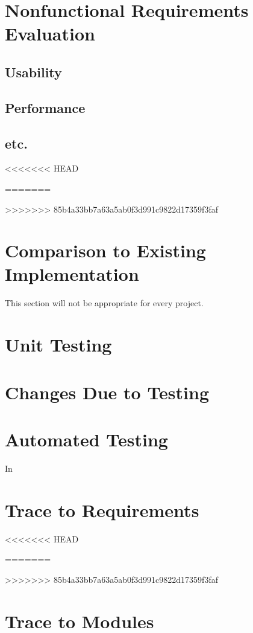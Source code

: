 \documentclass[12pt, titlepage]{article}
\begin{document}
\section{Nonfunctional Requirements Evaluation}

\subsection{Usability}

\subsection{Performance}

\subsection{etc.}
<<<<<<< HEAD
	
=======

>>>>>>> 85b4a33bb7a63a5ab0f3d991c9822d17359f3faf
\section{Comparison to Existing Implementation}

This section will not be appropriate for every project.

\section{Unit Testing}

\section{Changes Due to Testing}

\section{Automated Testing}
In

\section{Trace to Requirements}
<<<<<<< HEAD
		
=======

>>>>>>> 85b4a33bb7a63a5ab0f3d991c9822d17359f3faf
\section{Trace to Modules}
\end{document}
